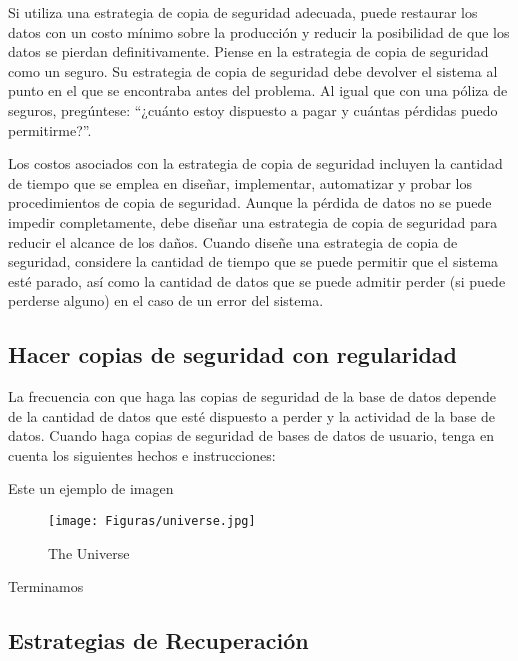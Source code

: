 Si utiliza una estrategia de copia de seguridad adecuada, puede restaurar los datos con un costo mínimo sobre la producción y reducir la posibilidad de que los datos se pierdan definitivamente. Piense en la estrategia de copia de seguridad como un seguro. Su estrategia de copia de seguridad debe devolver el sistema al punto en el que se encontraba antes del problema. Al igual que con una póliza de seguros, pregúntese: “¿cuánto estoy dispuesto a pagar y cuántas pérdidas puedo permitirme?”.

\item
\item

Los costos asociados con la estrategia de copia de seguridad incluyen la cantidad de tiempo que se emplea en diseñar, implementar, automatizar y probar los procedimientos de copia de seguridad. Aunque la pérdida de datos no se puede impedir completamente, debe diseñar una estrategia de copia de seguridad para reducir el alcance de los daños. Cuando diseñe una estrategia de copia de seguridad, considere la cantidad de tiempo que se puede permitir que el sistema esté parado, así como la cantidad de datos que se puede admitir perder (si puede perderse alguno) en el caso de un error del sistema.

\item
\item
    
\subsection{Hacer copias de seguridad con regularidad}  
La frecuencia con que haga las copias de seguridad de la base de datos depende de la cantidad de datos que esté dispuesto a perder y la actividad de la base de datos. Cuando haga copias de seguridad de bases de datos de usuario, tenga en cuenta los siguientes hechos e instrucciones:





Este un ejemplo de imagen

\begin{figure}[ht]
\centering
\texttt{[image: Figuras/universe.jpg]}
\caption{The Universe}
\label{fig:universe}
\end{figure}

Terminamos

\subsection{Estrategias de Recuperaci\'on}

